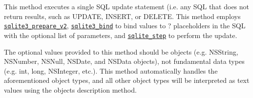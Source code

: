This method executes a single S\+QL update statement (i.\+e. any S\+QL that does not return results, such as {\ttfamily U\+P\+D\+A\+TE}, {\ttfamily I\+N\+S\+E\+RT}, or {\ttfamily D\+E\+L\+E\+TE}. This method employs \href{http://sqlite.org/c3ref/prepare.html}{\tt {\ttfamily sqlite3\+\_\+prepare\+\_\+v2}}, \href{http://sqlite.org/c3ref/bind_blob.html}{\tt {\ttfamily sqlite3\+\_\+bind}} to bind values to {\ttfamily ?} placeholders in the S\+QL with the optional list of parameters, and \href{http://sqlite.org/c3ref/step.html}{\tt {\ttfamily sqlite\+\_\+step}} to perform the update.

The optional values provided to this method should be objects (e.\+g. {\ttfamily N\+S\+String}, {\ttfamily N\+S\+Number}, {\ttfamily N\+S\+Null}, {\ttfamily N\+S\+Date}, and {\ttfamily N\+S\+Data} objects), not fundamental data types (e.\+g. {\ttfamily int}, {\ttfamily long}, {\ttfamily N\+S\+Integer}, etc.). This method automatically handles the aforementioned object types, and all other object types will be interpreted as text values using the object\textquotesingle{}s {\ttfamily description} method.


